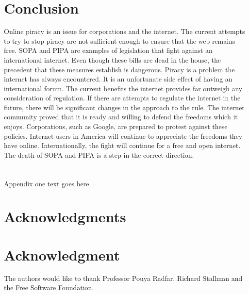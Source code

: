 \documentclass[11pt,journal,compsoc]{IEEEtran}
\begin{document}
\section{Conclusion}
Online piracy is an issue for corporations and the internet. The current attempts to try to stop piracy are not sufficient enough to ensure that the web remains free. SOPA and PIPA are examples of legislation that fight against an international internet. Even though these bills are dead in the house, the precedent that these measures establish is dangerous. Piracy is a problem the internet has always encountered. It is an unfortunate side effect of having an international forum. The current benefits the internet provides far outweigh any consideration of regulation.  If there are attempts to regulate the internet in the future, there will be significant changes in the approach to the rule. The internet community proved that it is ready and willing to defend the freedoms which it enjoys. Corporations, such as Google, are prepared to protest against these policies. Internet users in America will continue to appreciate the freedoms they have online. Internationally, the fight will continue for a free and open internet. The death of SOPA and PIPA is a step in the correct direction.

\appendices
\section{}
Appendix one text goes here.


\ifCLASSOPTIONcompsoc
  \section*{Acknowledgments}
\else
  \section*{Acknowledgment}
\fi


The authors would like to thank Professor Pouya Radfar, Richard Stallman and the Free Software Foundation.


\ifCLASSOPTIONcaptionsoff
  \newpage
\fi


\end{document}

